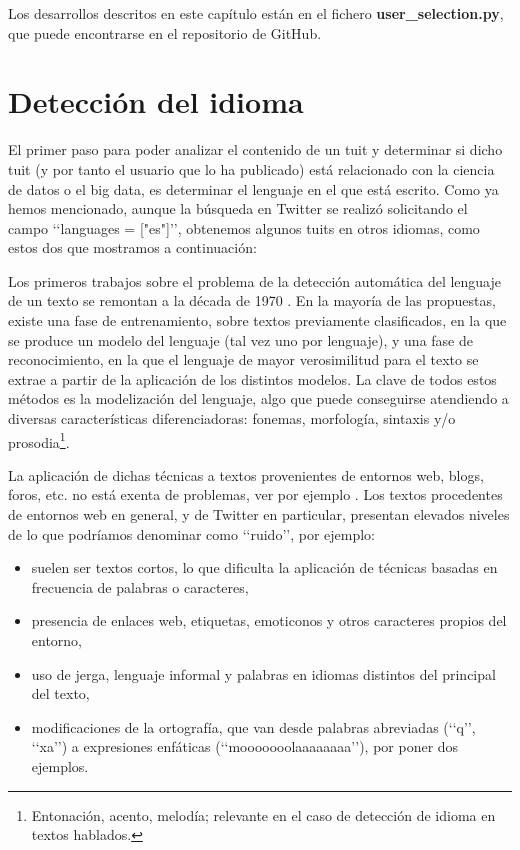 Los desarrollos descritos en este capítulo están en el fichero {\bf user\_selection.py}, 
que puede encontrarse en el repositorio de GitHub.


\section{Detección del idioma} 
\label{sect:deteccion_idioma}

El primer paso para poder analizar el contenido de un tuit y determinar si dicho tuit 
(y por tanto el usuario que lo ha publicado) está relacionado con la ciencia de datos o el big data,
es determinar el lenguaje en el que está escrito. Como ya hemos mencionado,
aunque la búsqueda en Twitter se realizó solicitando el campo \lq\lq languages = ["es"]\rq\rq,
obtenemos algunos tuits en otros idiomas, como estos dos 
que mostramos a continuación:


Los primeros trabajos sobre el problema de la detección automática del lenguaje de un texto
se remontan a la década de 1970 \cite{zissman-berkling}. En la mayoría de las propuestas, 
existe una fase de entrenamiento, sobre textos previamente clasificados, en la que se produce 
un modelo del lenguaje (tal vez uno por lenguaje), y una fase de reconocimiento, en la que 
el lenguaje de mayor verosimilitud para el texto se extrae a partir de la aplicación de los 
distintos modelos. La clave de todos estos métodos es la modelización del lenguaje, algo que puede 
conseguirse atendiendo a diversas características diferenciadoras: fonemas, morfología, 
sintaxis y/o prosodia\footnote{Entonación, acento, melodía; relevante en el
caso de detección de idioma en textos hablados.}. 

La aplicación de dichas técnicas a textos provenientes de entornos web, blogs,  foros, etc. 
no está exenta de problemas, ver por ejemplo \cite{almeida_estevez_piad}.
Los textos procedentes de entornos web en general, y de Twitter en particular, 
presentan elevados niveles de lo que podríamos denominar como \lq\lq ruido\rq\rq,
por ejemplo:
\begin{itemize}
\item suelen ser textos cortos, lo que dificulta la aplicación de técnicas basadas en frecuencia 
de palabras o caracteres,
\item presencia de enlaces web, etiquetas, emoticonos y otros caracteres propios del entorno,
\item uso de jerga, lenguaje informal y palabras en idiomas distintos del principal del texto,
\item modificaciones de la ortografía, que van desde palabras abreviadas (\lq\lq q\rq\rq, 
\lq\lq xa\rq\rq) a expresiones enfáticas (\lq\lq mooooooolaaaaaaaa\rq\rq), por poner dos 
ejemplos.
\end{itemize}


